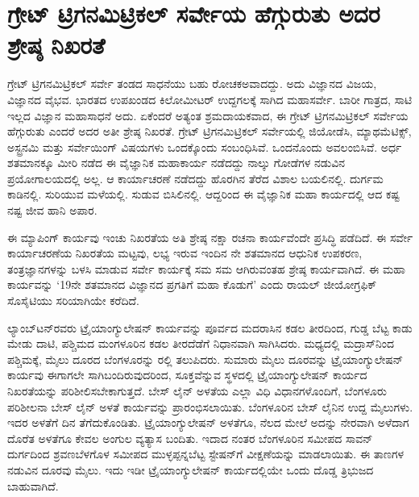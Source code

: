 
\chapter{ಗ್ರೇಟ್​ ಟ್ರಿಗನಮಿಟ್ರಿಕಲ್​ ಸರ್ವೇಯ ಹೆಗ್ಗುರುತು ಅದರ ಶ್ರೇಷ್ಠ ನಿಖರತೆ}

\vskip -8pt

ಗ್ರೇಟ್​ ಟ್ರಿಗನಮಿಟ್ರಿಕಲ್​ ಸರ್ವೇ ತಂಡದ ಸಾಧನೆಯು ಬಹು ರೋಚಕಅವಾದದ್ದು. ಅದು ವಿಜ್ಞಾನದ ವಿಜಯ, ವಿಜ್ಞಾನದ ವೈಭವ. ಭಾರತದ ಉಪಖಂಡದ  ಕಿಲೋಮೀಟರ್​ ಉದ್ದಗಲಕ್ಕೆ ಸಾಗಿದ ಮಹಾಸರ್ವೇ. ಬಾರೀ ಗಾತ್ರದ, ಸಾಟಿ ಇಲ್ಲದ ವಿಜ್ಞಾನ ಮಹಾಸಾಧನೆ ಅದು. ಏಕೆಂದರೆ ಅತ್ಯಂತ ಶ್ರಮದಾಯಕವಾದ, ಈ ಗ್ರೇಟ್​ ಟ್ರಿಗನಮಿಟ್ರಿಕಲ್​ ಸರ್ವೇಯ ಹೆಗ್ಗುರುತು ಎಂದರೆ ಅದರ ಅತೀ ಶ್ರೇಷ್ಠ ನಿಖರತೆ. ಗ್ರೇಟ್​ ಟ್ರಿಗನಮಿಟ್ರಿಕಲ್​ ಸರ್ವೇಯಲ್ಲಿ ಜಿಯೋಡೆಸಿ, ಮ್ಯಾಥಮೆಟಿಕ್ಸ್​, ಅಸ್ಟ್ರನಮಿ ಮತ್ತು ಸರ್ವೇಯಿಂಗ್​ ವಿಷಯಗಳು ಒಂದಕ್ಕೊಂದು ಸಂಬಂಧಿಸಿವೆ. ಒಂದನೊಂದು ಅವಲಂಬಿಸಿವೆ. ಅರ್ಧ ಶತಮಾನಕ್ಕೂ ಮೀರಿ ನಡೆದ ಈ ವೈಜ್ಞಾನಿಕ ಮಹಾಕಾರ್ಯ ನಡೆದದ್ದು ನಾಲ್ಕು ಗೋಡೆಗಳ ನಡುವಿನ ಪ್ರಯೋಗಾಲಯದಲ್ಲಿ ಅಲ್ಲ. ಆ ಕಾರ್ಯಾಚರಣೆ ನಡೆದದ್ದು ಹೊರಗಿನ ತೆರೆದ ವಿಶಾಲ ಬಯಲಿನಲ್ಲಿ. ದುರ್ಗಮ ಕಾಡಿನಲ್ಲಿ. ಸುರಿಯುವ ಮಳೆಯಲ್ಲಿ. ಸುಡುವ ಬಿಸಿಲಿನಲ್ಲಿ. ಆದ್ದರಿಂದ ಈ ವೈಜ್ಞಾನಿಕ ಮಹಾ ಕಾರ್ಯದಲ್ಲಿ ಆದ ಕಷ್ಟ ನಷ್ಟ ಜೀವ ಹಾನಿ ಅಪಾರ.

ಈ ಮ್ಯಾಪಿಂಗ್​ ಕಾರ್ಯವು ಇಂಚು ನಿಖರತೆಯ ಅತಿ ಶ್ರೇಷ್ಠ ನಕ್ಷಾ ರಚನಾ ಕಾರ್ಯವೆಂದೇ ಪ್ರಸಿದ್ಧಿ ಪಡೆದಿದೆ. ಈ ಸರ್ವೇ ಕಾರ್ಯಾಚರಣೆಯ ನಿಖರತೆಯ ಮಟ್ಟವು, ಲಭ್ಯ ಇರುವ ಇಂದಿನ ನೇ ಶತಮಾನದ ಆಧುನಿಕ ಉಪಕರಣ, ತಂತ್ರಜ್ಞಾನಗಳನ್ನು ಬಳಸಿ ಮಾಡುವ ಸರ್ವೇ ಕಾರ್ಯಕ್ಕೆ ಸಮ ಸಮ ಆಗಿರುವಂತಹ ಶ್ರೇಷ್ಠ ಕಾರ್ಯವಾಗಿದೆ. ಈ ಮಹಾ ಕಾರ್ಯವನ್ನು ‘19ನೇ ಶತಮಾನದ ವಿಜ್ಞಾನದ ಪ್ರಗತಿಗೆ ಮಹಾ ಕೊಡುಗೆ’ ಎಂದು ರಾಯಲ್​ ಜೀಯೋಗ್ರಫಿಕ್​ ಸೊಸೈಟಿಯು ಸರಿಯಾಗಿಯೇ ಕರೆದಿದೆ.

ಲ್ಯಾಂಬ್​ಟನ್​ರವರು ಟ್ರೈಯಾಂಗ್ಯುಲೇಷನ್​ ಕಾರ್ಯವನ್ನು ಪೂರ್ವದ ಮದರಾಸಿನ ಕಡಲ ತೀರದಿಂದ, ಗುಡ್ಡ ಬೆಟ್ಟ ಕಾಡು ಮೇಡು ದಾಟಿ, ಪಶ್ಚಿಮದ ಮಂಗಳೂರಿನ ಕಡಲ ತೀರದೆಡೆಗೆ ನಿಧಾನವಾಗಿ ಸಾಗಿಸಿದರು. ಮಧ್ಯದಲ್ಲಿ ಮದ್ರಾಸ್​ನಿಂದ ಪಶ್ಚಿಮಕ್ಕೆ,  ಮೈಲು ದೂರದ ಬೆಂಗಳೂರನ್ನು  ರಲ್ಲಿ ತಲುಪಿದರು. ಸುಮಾರು  ಮೈಲು ದೂರವನ್ನು ಟ್ರೈಯಾಂಗ್ಯುಲೇಷನ್​ ಕಾರ್ಯವು ಈಗಾಗಲೇ ಸಾಗಿಬಂದಿರುವುದರಿಂದ, ಸೂಕ್ತವೆನ್ನುವ ಸ್ಥಳದಲ್ಲಿ ಟ್ರೈಯಾಂಗ್ಯುಲೇಷನ್​ ಕಾರ್ಯದ ನಿಖರತೆಯನ್ನು ಪರಿಶೀಲಿಸಬೇಕಾಗುತ್ತದೆ. ಬೇಸ್​ ಲೈನ್​ ಅಳತೆಯ ಎಲ್ಲಾ ವಿಧಿ ವಿಧಾನಗಳೊಂದಿಗೆ, ಬೆಂಗಳೂರು ಪರಿಶೀಲನಾ ಬೇಸ್​ ಲೈನ್​ ಅಳತೆ ಕಾರ್ಯವನ್ನು ಪ್ರಾರಂಭಿಸಲಾಯಿತು. ಬೆಂಗಳೂರಿನ ಬೇಸ್​ ಲೈನಿನ ಉದ್ದ  ಮೈಲುಗಳು. ಇದರ ಅಳತೆಗೆ  ದಿನ ತೆಗೆದುಕೊಂಡಿತು. ಟ್ರೈಯಾಂಗ್ಯುಲೇಷನ್​ ಅಳತೆಗೂ, ನೆಲದ ಮೇಲೆ ಅದನ್ನು ನೇರವಾಗಿ ಅಳೆದಾಗ ದೊರೆತ ಅಳತೆಗೂ ಕೇವಲ  ಅಂಗುಲ ವ್ಯತ್ಯಾಸ ಬಂದಿತು. ಇದಾದ ನಂತರ ಬೆಂಗಳೂರಿನ ಸಮೀಪದ ಸಾವನ್​ ದುರ್ಗದಿಂದ ಶ್ರವಣಬೆಳಗೊಳ ಸಮೀಪದ ಮುಳ್ಳಪ್ಪನ್ನಬೆಟ್ಟ ಸ್ಟೇಷನ್​ಗೆ ವೀಕ್ಷಣೆಯನ್ನು ಮಾಡಲಾಯಿತು. ಈ ತಾಣಗಳ ನಡುವಿನ ದೂರವು  ಮೈಲು. ಇದು ಇಡೀ ಟ್ರೈಯಾಂಗ್ಯುಲೇಷನ್​ ಕಾರ್ಯದಲ್ಲಿಯೇ ಒಂದು ದೊಡ್ಡ ತ್ರಿಭುಜದ ಬಾಹುವಾಗಿದೆ.

\vskip 5pt

